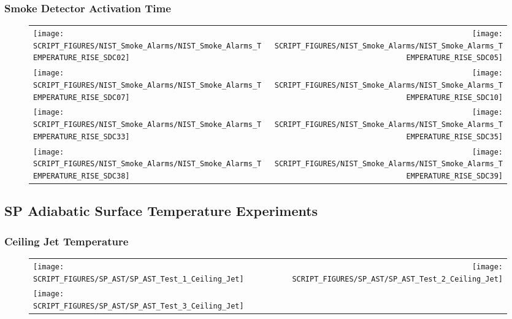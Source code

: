 \clearpage

\subsubsection{Smoke Detector Activation Time}

\begin{figure}[!ht]
\begin{tabular*}{\textwidth}{l@{\extracolsep{\fill}}r}
\texttt{[image: SCRIPT\_FIGURES/NIST\_Smoke\_Alarms/NIST\_Smoke\_Alarms\_TEMPERATURE\_RISE\_SDC02]} &
\texttt{[image: SCRIPT\_FIGURES/NIST\_Smoke\_Alarms/NIST\_Smoke\_Alarms\_TEMPERATURE\_RISE\_SDC05]} \\
\texttt{[image: SCRIPT\_FIGURES/NIST\_Smoke\_Alarms/NIST\_Smoke\_Alarms\_TEMPERATURE\_RISE\_SDC07]} &
\texttt{[image: SCRIPT\_FIGURES/NIST\_Smoke\_Alarms/NIST\_Smoke\_Alarms\_TEMPERATURE\_RISE\_SDC10]} \\
\texttt{[image: SCRIPT\_FIGURES/NIST\_Smoke\_Alarms/NIST\_Smoke\_Alarms\_TEMPERATURE\_RISE\_SDC33]} &
\texttt{[image: SCRIPT\_FIGURES/NIST\_Smoke\_Alarms/NIST\_Smoke\_Alarms\_TEMPERATURE\_RISE\_SDC35]} \\
\texttt{[image: SCRIPT\_FIGURES/NIST\_Smoke\_Alarms/NIST\_Smoke\_Alarms\_TEMPERATURE\_RISE\_SDC38]} &
\texttt{[image: SCRIPT\_FIGURES/NIST\_Smoke\_Alarms/NIST\_Smoke\_Alarms\_TEMPERATURE\_RISE\_SDC39]}
\end{tabular*}
\end{figure}

\clearpage

\subsection{SP Adiabatic Surface Temperature Experiments}

\subsubsection{Ceiling Jet Temperature}

\begin{figure}[!ht]
\begin{tabular*}{\textwidth}{l@{\extracolsep{\fill}}r}
\texttt{[image: SCRIPT\_FIGURES/SP\_AST/SP\_AST\_Test\_1\_Ceiling\_Jet]} &
\texttt{[image: SCRIPT\_FIGURES/SP\_AST/SP\_AST\_Test\_2\_Ceiling\_Jet]} \\
\texttt{[image: SCRIPT\_FIGURES/SP\_AST/SP\_AST\_Test\_3\_Ceiling\_Jet]}
\end{tabular*}
\end{figure}

